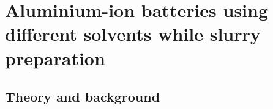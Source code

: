 
\chapter{Aluminium-ion batteries using different solvents while slurry preparation} %

\label{Chapter7} %


\newcommand{\keyword}[1]{\textbf{#1}}
\newcommand{\tabhead}[1]{\textbf{#1}}
\newcommand{\code}[1]{\texttt{#1}}
\newcommand{\file}[1]{\texttt{\bfseries#1}}
\newcommand{\option}[1]{\texttt{\itshape#1}}

\section{Theory and background}
